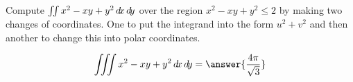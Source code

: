 \documentclass{ximera}
\author{David Guichard \and Neal Koblitz \and H. Jerome Keisler \and Albert Scheller \and Barry Balof \and Mike Wills \and Matthew Carr}
\begin{document}
\begin{exercise}




Compute $\iint x^2-xy+y^2\mathop{}\!d\! x \mathop{}\!d\! y$ over the region $x^2-xy+y^2\le 2$ by making two changes of coordinates. One to put the integrand into the form $u^2+v^2$ and then another to change this into polar coordinates.

\begin{prompt}
\[
\iiint x^2-xy+y^2 \d x \d y=\answer{\frac{4\pi}{\sqrt{3}}}
\]
\end{prompt}



\end{exercise}
\end{document}
